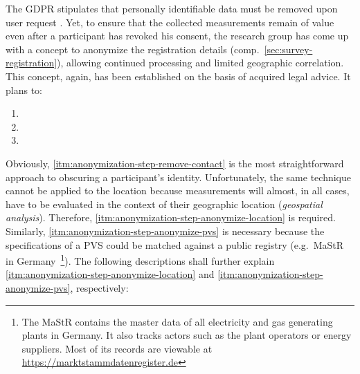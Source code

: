 The \acs{GDPR} stipulates that personally identifiable data must be removed upon user request \cite[Art.~17,§~1]{eu2016gdpr}. Yet, to ensure that the collected measurements remain of value even after a participant has revoked his consent, the research group has come up with a concept to anonymize the registration details (comp.~\autoref{sec:survey-registration}), allowing continued processing and limited geographic correlation. This concept, again, has been established on the basis of acquired legal advice. It plans to:

\begin{enumerate}[label=(\Alph*)]
  \item {}
  \item {}
  \item {}
\end{enumerate}

Obviously, \ref{itm:anonymization-step-remove-contact} is the most straightforward approach to obscuring a participant's identity. Unfortunately, the same technique cannot be applied to the location because measurements will almost, in all cases, have to be evaluated in the context of their geographic location (\textit{geospatial analysis}). Therefore, \ref{itm:anonymization-step-anonymize-location} is required. Similarly, \ref{itm:anonymization-step-anonymize-pvs} is necessary because the specifications of a \acs{PVS} could be matched against a public registry (e.g.~\acs{MaStR} in Germany~\footnote{The \ac{MaStR} contains the master data of all electricity and gas generating plants in Germany. It also tracks actors such as the plant operators or energy suppliers. Most of its records are viewable at \url{https://marktstammdatenregister.de}}). The following descriptions shall further explain \ref{itm:anonymization-step-anonymize-location} and \ref{itm:anonymization-step-anonymize-pvs}, respectively:

